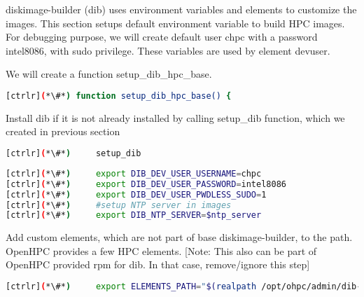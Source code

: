 
	diskimage-builder (dib) uses environment variables and elements to customize the images. This section setups default environment variable to build HPC images. For debugging purpose, we will create default user chpc with a password intel8086, with sudo privilege. These variables are used by element devuser. 

	We will create a function setup\_dib\_hpc\_base.

\begin{lstlisting}[language=bash,keywords={}]
[ctrlr](*\#*) function setup_dib_hpc_base() {
\end{lstlisting}

	Install dib if it is not already installed by calling setup\_dib function, which we created in previous section

\begin{lstlisting}[language=bash,keywords={}]
[ctrlr](*\#*)     setup_dib
\end{lstlisting}

\begin{lstlisting}[language=bash,keywords={}]
[ctrlr](*\#*)     export DIB_DEV_USER_USERNAME=chpc
[ctrlr](*\#*)     export DIB_DEV_USER_PASSWORD=intel8086
[ctrlr](*\#*)     export DIB_DEV_USER_PWDLESS_SUDO=1
[ctrlr](*\#*)     #setup NTP server in images
[ctrlr](*\#*)     export DIB_NTP_SERVER=$ntp_server
\end{lstlisting}

	Add custom elements, which are not part of base diskimage-builder, to the path. OpenHPC provides a few HPC elements. [Note: This also can be part of OpenHPC provided rpm for dib. In that case, remove/ignore this step]

\begin{lstlisting}[language=bash,keywords={}]
[ctrlr](*\#*)     export ELEMENTS_PATH="$(realpath /opt/ohpc/admin/dib-chpc/elements/)"
\end{lstlisting}

